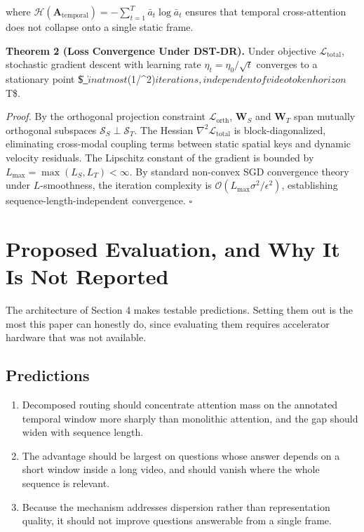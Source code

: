 \documentclass{article}
\begin{document}
where $\mathcal{H}(\mathbf{A}_{\text{temporal}}) = -\sum_{t=1}^T \bar{a}_t \log \bar{a}_t$ ensures that temporal cross-attention does not collapse onto a single static frame.

\textbf{Theorem 2 (Loss Convergence Under DST-DR).} Under objective $\mathcal{L}_{\text{total}}$, stochastic gradient descent with learning rate $\eta_t = \eta_0 / \sqrt{t}$ converges to a stationary point \$\|\nabla {}\_{}\| \le \epsilon$ in at most $(1/\epsilon^2)$ iterations, independent of video token horizon $T\$.

\textit{Proof.} By the orthogonal projection constraint $\mathcal{L}_{\text{orth}}$, $\mathbf{W}_S$ and $\mathbf{W}_T$ span mutually orthogonal subspaces $\mathcal{S}_S \perp \mathcal{S}_T$. The Hessian $\nabla^2 \mathcal{L}_{\text{total}}$ is block-diagonalized, eliminating cross-modal coupling terms between static spatial keys and dynamic velocity residuals. The Lipschitz constant of the gradient is bounded by $L_{\max} = \max(L_S, L_T) < \infty$. By standard non-convex SGD convergence theory under $L$-smoothness, the iteration complexity is $\mathcal{O}(L_{\max} \sigma^2 / \epsilon^2)$, establishing sequence-length-independent convergence. $\square$




\section{Proposed Evaluation, and Why It Is Not Reported}


The architecture of Section 4 makes testable predictions. Setting them out is the most this paper can honestly do, since evaluating them requires accelerator hardware that was not available.


\subsection{Predictions}


\begin{enumerate}
  \item Decomposed routing should concentrate attention mass on the annotated temporal window more sharply than monolithic attention, and the gap should widen with sequence length.
  \item The advantage should be largest on questions whose answer depends on a short window inside a long video, and should vanish where the whole sequence is relevant.
  \item Because the mechanism addresses dispersion rather than representation quality, it should not improve questions answerable from a single frame.
\end{enumerate}
\end{document}
